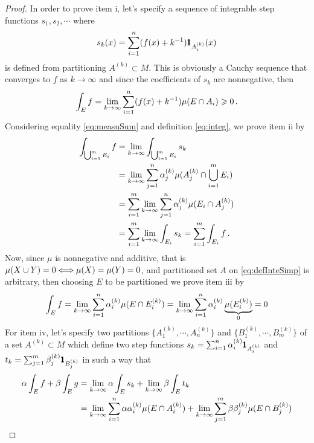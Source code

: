 \begin{proof}
{\footnotesize
In order to prove item i, let's specify a sequence of integrable step functions $s_1,s_2,\cdots$ where
\begin{equation*}
s_k(x)=\sum_{{i}=1}^n(f(x)+k^{-1})\pmb{1}_{A_i^{(k)}}(x)
\end{equation*}
is defined from partitioning $A^{(k)}\subset M$. This is obviously a Cauchy sequence that converges to $f$ as $k\to\infty$ and since the coefficients of $s_k$ are nonnegative, then
\begin{equation*}
\int_E f=\lim_{k\to \infty}\sum_{i=1}^n(f(x)+k^{-1})\mu(E\cap A_i)\geqslant 0\,.
\end{equation*}
Considering equality \eqref{eq:measuSum} and definition \eqref{eq:integ}, we prove item ii by
\begin{align*}
\int_{\bigcup_{i=1}^mE_i}f &= \lim_{k\to \infty}\int_{\bigcup_{i=1}^mE_i} s_k\\
&=\lim_{k\to \infty} \sum_{j=1}^n\alpha_{j}^{(k)}\mu(A_j^{(k)}\cap\bigcup_{i=1}^m E_i)\\
&=\sum_{i=1}^m\lim_{k\to \infty} \sum_{j=1}^n\alpha_{j}^{(k)}\mu( E_i\cap A_j^{(k)})\\
&=\sum_{i=1}^m\lim_{k\to \infty} \int_{E_i} s_k = \sum_{i=1}^m \int_{E_i} f\,.
\end{align*}
Now, since $\mu$ is nonnegative and additive, that is $\mu(X\cup Y)=0\Longleftrightarrow\mu(X)=\mu(Y)=0$, and partitioned set $A$ on \eqref{eq:defInteSimp} is arbitrary, then choosing $E$ to be partitioned we prove item iii by
\begin{equation*}
\int_E f = \lim_{k\to \infty} \sum_{i=1}^n\alpha_{i}^{(k)}\mu( E\cap E_i^{(k)}) = \lim_{k\to \infty} \sum_{i=1}^n\alpha_{i}^{(k)}\underbrace{\mu(E_i^{(k)})}_{0} = 0
\end{equation*}
For item iv, let's specify two partitions $\{A_1^{(k)},\cdots,A_n^{(k)}\}$ and $\{B_1^{(k)},\cdots,B_m^{(k)}\}$ of a set $A^{(k)}\subset M$ which define two step functions $s_k=\sum_{{i}=1}^n\alpha^{(k)}_i\pmb{1}_{A_i^{(k)}}$ and $t_k=\sum_{{j}=1}^m\beta^{(k)}_j\pmb{1}_{B_j^{(k)}}$ in such a way that
\begin{align*}
\alpha\int_{E}f+\beta\int_{E}g&=\lim_{k\to\infty}\alpha\int_{E}s_k + \lim_{k\to\infty}\beta\int_{E}t_k\\
&=\lim_{k\to\infty}\sum_{i=1}^n\alpha\alpha_i^{(k)}\fua{\mu}{E\cap A_i^{(k)}}+\lim_{k\to\infty}\sum_{j=1}^m\beta\beta_j^{(k)}\fua{\mu}{E\cap B_j^{(k)}}\\

\end{align*}}
\end{proof}
